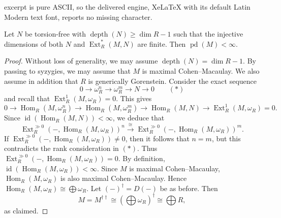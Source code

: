 \documentclass[10pt,a4paper]{amsart}
\newcommand{\Ext}{\operatorname{Ext}}
\newcommand{\Hom}{\operatorname{Hom}}
\newcommand{\depth}{\operatorname{depth}}
\newcommand{\id}{\operatorname{id}}
\newcommand{\pd}{\operatorname{pd}}
\begin{document}
excerpt is pure ASCII, so the delivered engine, XeLaTeX with its default Latin Modern text font, reports no missing character.
\begin{proposition}
	Let $N$ be torsion-free with $\depth(N) \geq \dim R - 1$ such that the injective dimensions of both $N$ and $\Ext^\ast_R(M, N)$ are finite. Then $\pd(M) < \infty$.
\end{proposition}

\begin{proof}
	Without loss of generality, we may assume $\depth(N) = \dim R - 1$. By passing to syzygies, we may assume that $M$ is maximal Cohen--Macaulay. We also assume in addition that $R$ is generically Gorenstein. Consider the exact sequence
	\[
	0 \longrightarrow \omega_R^n \longrightarrow \omega_R^m \longrightarrow N \longrightarrow 0 \qquad (\ast)
	\]
	and recall that $\Ext^1_R(M, \omega_R) = 0$. This gives
	\[
	0 \to \Hom_R(M, \omega_R^n) \to \Hom_R(M, \omega_R^m) \to \Hom_R(M, N) \to \Ext^1_R(M, \omega_R) = 0.
	\]
	Since $\id(\Hom_R(M, N)) < \infty$, we deduce that
	\[
	\Ext^{\gg 0}_R(-, \Hom_R(M, \omega_R))^n \stackrel{\cong}{\longrightarrow} \Ext^{\gg 0}_R(-, \Hom_R(M, \omega_R))^m.
	\]
	If $\Ext^{\gg 0}_R(-, \Hom_R(M, \omega_R)) \neq 0$, then it follows that $n = m$, but this contradicts the rank consideration in $(\ast)$. Thus $\Ext^{\gg 0}_R(-, \Hom_R(M, \omega_R)) = 0$. By definition, $\id(\Hom_R(M, \omega_R)) < \infty$. Since $M$ is maximal Cohen--Macaulay, $\Hom_R(M, \omega_R)$ is also maximal Cohen--Macaulay. Hence $\Hom_R(M, \omega_R) \cong \bigoplus \omega_R$. Let $(-)^\dagger = D(-)$ be as before. Then
	\[
	M = M^{\dagger\dagger} \cong \left(\bigoplus \omega_R\right)^\dagger \cong \bigoplus R,
	\]
	as claimed.
\end{proof}
\end{document}
